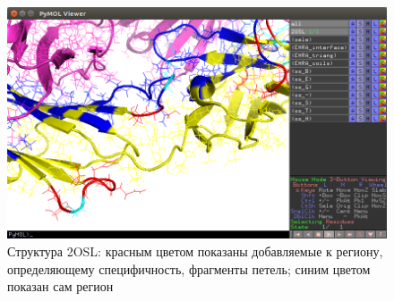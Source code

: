 












\begin{figure}
\includegraphics[width=0.85\linewidth]{loops4.png}

\caption{\small{Структура 2OSL: красным цветом показаны добавляемые к региону, определяющему специфичность, фрагменты петель; синим цветом показан сам регион
 }}
\label{fig:loops4}
\end{figure}


